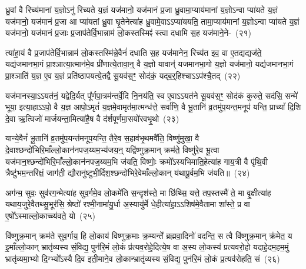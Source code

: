 {\anuvakamend[{द॒र्॒\mbox{}श॒पू॒र्ण॒मा॒सयो॑रुभ॒यतो॑ देवा॒श्वाः सु॒रेताः᳚ प्र॒जा\-प॑तिर्मिथु॒नेना᳚\-ऽऽ\-प्नोत्य॒ष्टौ च॑}]}%

ध्रु॒वां वै रिच्य॑मानां य॒ज्ञो\-ऽनु॑ रिच्यते य॒ज्ञं यज॑मानो॒ यज॑मानं प्र॒जा ध्रु॒वामा॒प्याय॑मानां य॒ज्ञो\-ऽन्वा प्या॑यते य॒ज्ञं यज॑मानो॒ यज॑मानं प्र॒जा आ प्या॑यतां ध्रु॒वा घृ॒तेनेत्या॑ह ध्रु॒वामे॒वा\-ऽऽ\-प्या॑ययति॒ तामा॒प्याय॑मानां य॒ज्ञो\-ऽन्वा प्या॑यते य॒ज्ञं यज॑मानो॒ यज॑मानं प्र॒जाः प्र॒जा\-प॑तेर्वि॒भान्नाम॑ लो॒कस्तस्मिꣴ॑ स्त्वा दधामि स॒ह यज॑माने॒ने-~(२१)

त्या॑हा॒यं वै प्र॒जा\-प॑तेर्वि॒भान्नाम॑ लो॒कस्तस्मि॑न्ने॒वैनं॑ दधाति स॒ह यज॑मानेन॒ रिच्य॑त इव॒ वा ए॒तद्यद्यज॑ते॒ यद्य॑जमानभा॒गं प्रा॒श्ञात्या॒त्मान॑मे॒व प्री॑णात्ये॒तावा॒न्॒ वै य॒ज्ञो यावान्॑ यजमानभा॒गो य॒ज्ञो यज॑मानो॒ यद्य॑जमानभा॒गं प्रा॒श्ञाति॑ य॒ज्ञ ए॒व य॒ज्ञं प्रति॑ष्ठापयत्ये॒तद्वै सू॒यव॑स॒ꣳ॒ सोद॑कं॒ यद्ब॒र्॒\mbox{}हिश्चा\-ऽऽ\-प॑श्चै॒तद्~(२२)

यज॑मानस्या॒\-ऽऽ\-यत॑नं॒ यद्वेदि॒र्यत् पू᳚र्णपा॒त्रम॑न्तर्वे॒दि नि॒नय॑ति॒ स्व ए॒वा\-ऽऽ\-यत॑ने सू॒यव॑स॒ꣳ॒ सोद॑कं कुरुते॒ सद॑सि॒ सन्मे॑ भूया॒ इत्या॒हा\-ऽऽ\-पो॒ वै य॒ज्ञ आपो॒\-ऽमृतं॑ य॒ज्ञमे॒वामृत॑मा॒त्मन्ध॑त्ते॒ सर्वा॑णि॒ वै भू॒तानि॑ व्र॒तमु॑प॒यन्त॒मनूप॑ यन्ति॒ प्राच्यां᳚ दि॒शि दे॒वा ऋ॒त्विजो॑ मार्जयन्ता॒मित्या॑है॒ष वै द॑र्\mbox{}शपूर्णमा॒सयो॑रवभृ॒थो~(२३)

यान्ये॒वैनं॑ भू॒तानि॑ व्र॒तमु॑प॒यन्त॑मनूप॒यन्ति॒ तैरे॒व स॒हाव॑भृ॒थमवै॑ति॒ विष्णु॑मुखा॒ वै दे॒वाश्छन्दो॑भिरि॒माँल्लो॒कान॑नप\-ज॒य्यम॒भ्य॑जय॒न्॒ यद्वि॑ष्णुक्र॒मान् क्रम॑ते॒ विष्णु॑रे॒व भू॒त्वा यज॑मान॒श्छन्दो॑भि\-रि॒माँल्लो॒का\-न॑नप\-ज॒य्य\-म॒भि ज॑यति॒ विष्णोः॒ क्रमो᳚\-ऽस्यभिमाति॒हेत्या॑ह गाय॒त्री वै पृ॑थि॒वी त्रैष्टु॑भम॒न्तरि॑क्षं॒ जाग॑ती॒ द्यौरानु॑ष्टुभी॒र्दिश॒श्छन्दो॑\-भिरे॒वेमाँल्लो॒कान् य॑थापू॒र्वम॒भि ज॑यति॥~(२४)

{\anuvakamend[{इत्ये॒तद॑वभृ॒थो दिशः॑ स॒प्त च॑}]}%

अग॑न्म॒ सुवः॒ सुव॑रग॒न्मेत्या॑ह सुव॒र्गमे॒व लो॒कमे॑ति स॒न्दृश॑स्ते॒ मा छि॑थ्सि॒ यत्ते॒ तप॒स्तस्मै॑ ते॒ मा वृ॒क्षीत्या॑ह यथाय॒जुरे॒वैतथ्सु॒भूर॑सि॒ श्रेष्ठो॑ रश्मी॒नामा॑यु॒र्धा अ॒स्यायु॑र्मे धे॒हीत्या॑हा॒\-ऽऽ\-शिष॑मे॒वैतामा शा᳚स्ते॒ प्र वा ए॒षो᳚\-ऽस्माल्लो॒काच्च्य॑वते॒ यो~(२५)

वि॑ष्णुक्र॒मान् क्रम॑ते सुव॒र्गाय॒ हि लो॒काय॑ विष्णुक्र॒माः क्र॒म्यन्ते᳚ ब्रह्मवा॒दिनो॑ वदन्ति॒ स त्वै वि॑ष्णुक्र॒मान् क्र॑मेत॒ य इ॒माँल्लो॒कान् भ्रातृ॑व्यस्य सं॒विद्य॒ पुन॑रि॒मं लो॒कं प्र॑त्यव॒रोहे॒दित्ये॒ष वा अ॒स्य लो॒कस्य॑ प्रत्यवरो॒हो यदाहे॒दम॒हम॒मुं भ्रातृ॑व्यमा॒भ्यो दि॒ग्भ्यो᳚\-ऽस्यै दि॒व इती॒माने॒व लो॒कान्भ्रातृ॑व्यस्य सं॒विद्य॒ पुन॑रि॒मं लो॒कं प्र॒त्यव॑रोहति॒ सं~(२६)

